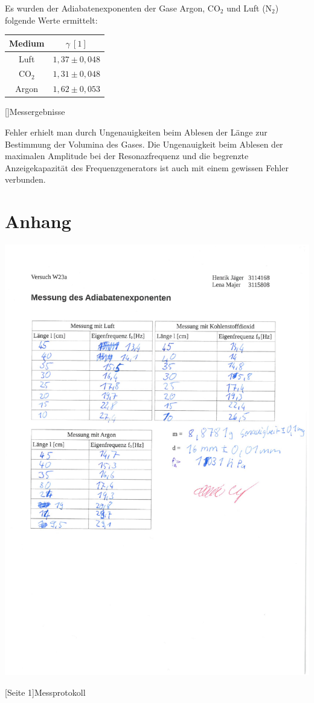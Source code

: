 \documentclass[12pt,a4paper,]{scrreprt}
\begin{document}
    
    Es wurden der Adiabatenexponenten der Gase Argon, CO$_2$ und Luft (N$_2$) folgende Werte ermittelt: 
    \begin{center}
    
    \begin{tabular}{c|c}
    	Medium & $\gamma ~ [1]$\\ \hline
        Luft & $1,37 \pm 0,048$\\
        CO$_2$ & $1,31 \pm 0,048$\\
        Argon& $1,62 \pm 0,053$
    \end{tabular}
    []{Messergebnisse}
    \end{center}
    Fehler erhielt man durch Ungenauigkeiten beim Ablesen der Länge zur Bestimmung der Volumina des Gases. Die Ungenauigkeit beim Ablesen der maximalen Amplitude bei der Resonazfrequenz und die begrenzte Anzeigekapazität des Frequenzgenerators ist auch mit einem gewissen Fehler verbunden.\\
	
	
	\printbibliography
    \pagebreak
    \chapter{Anhang}
    \begin{center}
    		\includegraphics[scale=0.65]{Daten/protokoll.pdf}
    	\end{center}
    	[Seite 1]{Messprotokoll}
	\pagebreak
\end{document}
